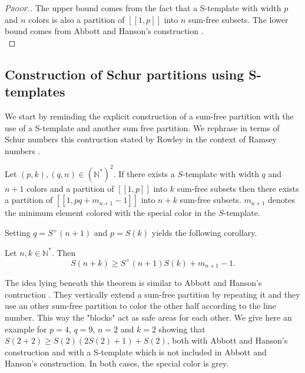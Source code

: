 \begin{proof}[\textsc{Proof.}]
The upper bound comes from the fact that a S-template with width \(p\) and \(n\) colors is also a partition of \([\![1, p]\!]\) 
into \(n\) sum-free subsets. The lower bound comes from Abbott and Hanson's construction \cite{AbbottHanson}. \\
\end{proof}


\subsection{Construction of Schur partitions using S-templates}

We start by reminding the explicit construction of a sum-free partition with the use of a S-template and another sum free partition. 
We rephrase in terms of Schur numbers this contruction stated by Rowley in the context of Ramsey numbers \cite{RowleyRamsey}.

\begin{theorem}
\label{thm:Stemp}
	Let \((p,k), (q,n) \in (\mathbb{N}^*)^2\). If there exists a \(S\)-template with width \(q\) and \(n+1\) colors 
	and a partition of \([\![1,p]\!]\) into \(k\) sum-free subsets then there exists a partition of \([\![1,pq+m_{n+1}
	-1]\!]\) into \(n+k\) sum-free subsets. \(m_{n+1}\) denotes the minimum element colored with the special color in the \(S\)-template.
\end{theorem}

Setting \(q = S^+(n+1)\) and \(p = S(k)\) yields the following corollary.

\begin{corollary}
\label{cor:ineqS}
	Let \(n, k \in \mathbb{N}^*\). Then
	\[ S(n+k) \geqslant S^+(n+1)S(k) + m_{n+1} - 1.\]
\end{corollary}

The idea lying beneath this theorem is similar to Abbott and Hanson's contruction \cite{AbbottHanson}. They vertically 
extend a sum-free partition by repeating it and they use an other sum-free partition to color the other half according 
to the line number. This way the "blocks" act as safe areas for each other. We give here an example for \(p = 4\), 
\(q = 9\), \(n = 2\) and \(k = 2\) showing that \(S(2 + 2) \geqslant S(2) \left(2 S(2) + 1\right) + S(2)\), both with Abbott and 
Hanson's construction and with a S-template which is not included in Abbott and Hanson's construction. In both cases, 
the special color is grey.


